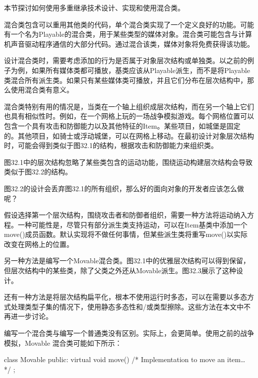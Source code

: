 
本节探讨如何使用多重继承技术设计、实现和使用混合类。


混合类包含可以重用其他类的代码，单个混合类实现了一个定义良好的功能。可能有一个名为Playable的混合类，用于某些类型的媒体对象。混合类可能包含与计算机声音驱动程序通信的大部分代码。通过混合该类，媒体对象将免费获得该功能。

设计混合类时，需要考虑添加的行为是否属于对象层次结构或单独类。以之前的例子为例，如果所有媒体类都可播放，基类应该从Playable派生，而不是将Playable类混合所有派生类。如果只有某些媒体类可播放，并且它们分布在层次结构中，那么使用混合类有意义。

混合类特别有用的情况是，当类在一个轴上组织成层次结构，而在另一个轴上它们也具有相似性时。例如，在一个网格上玩的一场战争模拟游戏。每个网格位置可以包含一个具有攻击和防御能力以及其他特征的Item。某些项目，如城堡是固定的。其他项目，如骑士或浮动城堡，可以在网格上移动。在最初设计对象层次结构时，可能会得到类似于图32.1的结构，根据攻击和防御能力来组织类。


图32.1中的层次结构忽略了某些类包含的运动功能，围绕运动构建层次结构会导致类似于图32.2的结构。


图32.2的设计会丢弃图32.1的所有组织，那么好的面向对象的开发者应该怎么做呢？

假设选择第一个层次结构，围绕攻击者和防御者组织，需要一种方法将运动纳入方程。一种可能性是，尽管只有部分派生类支持运动，可以在Item基类中添加一个move()成员函数。默认实现将不做任何事情，但某些派生类将重写move()以实际改变在网格上的位置。

另一种方法是编写一个Movable混合类。图32.1中的优雅层次结构可以得到保留，但层次结构中的某些类，除了父类之外还从Movable派生。图32.3展示了这种设计。


还有一种方法是将层次结构扁平化，根本不使用运行时多态，可以在需要以多态方式处理类型子集的情况下，使用静态多态性和/或类型擦除。这些方法在本文中不再进一步讨论。


编写一个混合类与编写一个普通类没有区别。实际上，会更简单。使用之前的战争模拟，Movable 混合类可能如下所示：

\begin{cpp}
class Movable
{
    public:
        virtual void move() { /* Implementation to move an item… */ }
};
\end{cpp}

